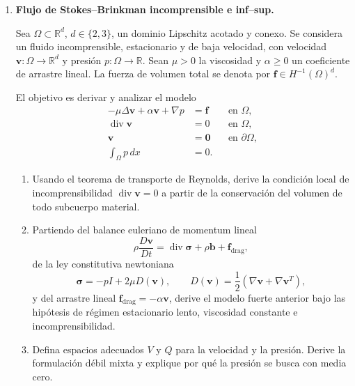 \documentclass[11pt]{article}
\newcommand{\R}{\mathbb{R}}
\DeclareMathOperator{\diver}{div}
\begin{document}
\begin{enumerate}[label=\textbf{\arabic*.}, leftmargin=*]

\item \textbf{Flujo de Stokes--Brinkman incomprensible e inf--sup.}

Sea $\Omega\subset\R^d$, $d\in\{2,3\}$, un dominio Lipschitz acotado y conexo. Se considera un fluido incomprensible, estacionario y de baja velocidad, con velocidad $\bm v:\Omega\to\R^d$ y presi\'on $p:\Omega\to\R$. Sean $\mu>0$ la viscosidad y $\alpha\ge 0$ un coeficiente de arrastre lineal. La fuerza de volumen total se denota por $\bm f\in H^{-1}(\Omega)^d$.

El objetivo es derivar y analizar el modelo
\begin{equation*}
\begin{aligned}
    -\mu\Delta \bm v+\alpha \bm v+\nabla p &= \bm f &&\text{en }\Omega,\\
    \diver \bm v &=0 &&\text{en }\Omega,\\
    \bm v&=\bm 0 &&\text{en }\partial\Omega,\\
    \int_\Omega p\,dx&=0.
\end{aligned}
\end{equation*}

\begin{enumerate}[label=(\alph*), leftmargin=*]
    \item Usando el teorema de transporte de Reynolds, derive la condici\'on local de incomprensibilidad $\diver\bm v=0$ a partir de la conservaci\'on del volumen de todo subcuerpo material.

    \item Partiendo del balance euleriano de momentum lineal
    \begin{equation*}
        \rho\frac{D\bm v}{Dt}=\diver\bm\sigma+\rho\bm b+\bm f_{\mathrm{drag}},
    \end{equation*}
    de la ley constitutiva newtoniana
    \begin{equation*}
        \bm\sigma=-pI+2\mu D(\bm v),
        \qquad
        D(\bm v)=\frac12\left(\nabla\bm v+\nabla\bm v^T\right),
    \end{equation*}
    y del arrastre lineal $\bm f_{\mathrm{drag}}=-\alpha\bm v$, derive el modelo fuerte anterior bajo las hip\'otesis de r\'egimen estacionario lento, viscosidad constante e incomprensibilidad.

    \item Defina espacios adecuados $V$ y $Q$ para la velocidad y la presi\'on. Derive la formulaci\'on d\'ebil mixta y explique por qu\'e la presi\'on se busca con media cero.


\end{enumerate}
\end{enumerate}
\end{document}
